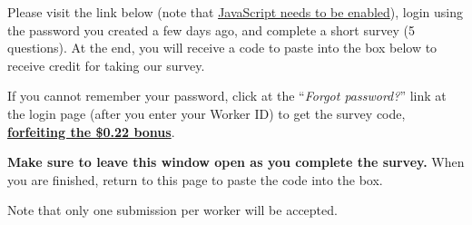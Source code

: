       Please visit the link below (note that \underline{JavaScript needs to be enabled}), login using the password you created a few days ago, and complete a short survey (5 questions). At the end, you will receive a code to paste into the box below to receive credit for taking our survey.

      If you cannot remember your password, click at the ``\emph{Forgot password?}'' link at the login page (after you enter your Worker ID) to get the survey code, \underline{\textbf{forfeiting the \$0.22 bonus}}.

      \textbf{Make sure to leave this window open as you complete the survey.} When you are finished, return to this page to paste the code into the box.

      Note that only one submission per worker will be accepted.


